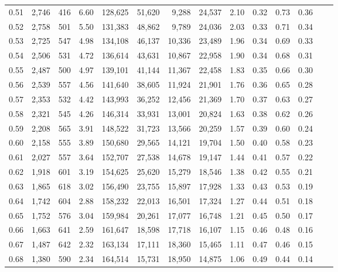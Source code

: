 \begin{tabular}{rrrrrrrrrrrrrr}
0.51 &  2,746 &  416 &    6.60 &  128,625 &   51,620 &   9,288 &  24,537 &  2.10 &  0.32 &  0.73 &      0.36 \\
0.52 &  2,758 &  501 &    5.50 &  131,383 &   48,862 &   9,789 &  24,036 &  2.03 &  0.33 &  0.71 &      0.34 \\
0.53 &  2,725 &  547 &    4.98 &  134,108 &   46,137 &  10,336 &  23,489 &  1.96 &  0.34 &  0.69 &      0.33 \\
0.54 &  2,506 &  531 &    4.72 &  136,614 &   43,631 &  10,867 &  22,958 &  1.90 &  0.34 &  0.68 &      0.31 \\
0.55 &  2,487 &  500 &    4.97 &  139,101 &   41,144 &  11,367 &  22,458 &  1.83 &  0.35 &  0.66 &      0.30 \\
0.56 &  2,539 &  557 &    4.56 &  141,640 &   38,605 &  11,924 &  21,901 &  1.76 &  0.36 &  0.65 &      0.28 \\
0.57 &  2,353 &  532 &    4.42 &  143,993 &   36,252 &  12,456 &  21,369 &  1.70 &  0.37 &  0.63 &      0.27 \\
0.58 &  2,321 &  545 &    4.26 &  146,314 &   33,931 &  13,001 &  20,824 &  1.63 &  0.38 &  0.62 &      0.26 \\
0.59 &  2,208 &  565 &    3.91 &  148,522 &   31,723 &  13,566 &  20,259 &  1.57 &  0.39 &  0.60 &      0.24 \\
0.60 &  2,158 &  555 &    3.89 &  150,680 &   29,565 &  14,121 &  19,704 &  1.50 &  0.40 &  0.58 &      0.23 \\
0.61 &  2,027 &  557 &    3.64 &  152,707 &   27,538 &  14,678 &  19,147 &  1.44 &  0.41 &  0.57 &      0.22 \\
0.62 &  1,918 &  601 &    3.19 &  154,625 &   25,620 &  15,279 &  18,546 &  1.38 &  0.42 &  0.55 &      0.21 \\
0.63 &  1,865 &  618 &    3.02 &  156,490 &   23,755 &  15,897 &  17,928 &  1.33 &  0.43 &  0.53 &      0.19 \\
0.64 &  1,742 &  604 &    2.88 &  158,232 &   22,013 &  16,501 &  17,324 &  1.27 &  0.44 &  0.51 &      0.18 \\
0.65 &  1,752 &  576 &    3.04 &  159,984 &   20,261 &  17,077 &  16,748 &  1.21 &  0.45 &  0.50 &      0.17 \\
0.66 &  1,663 &  641 &    2.59 &  161,647 &   18,598 &  17,718 &  16,107 &  1.15 &  0.46 &  0.48 &      0.16 \\
0.67 &  1,487 &  642 &    2.32 &  163,134 &   17,111 &  18,360 &  15,465 &  1.11 &  0.47 &  0.46 &      0.15 \\
0.68 &  1,380 &  590 &    2.34 &  164,514 &   15,731 &  18,950 &  14,875 &  1.06 &  0.49 &  0.44 &      0.14 \\

\end{tabular}
